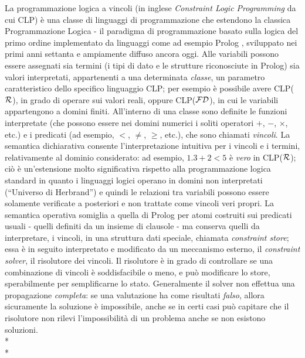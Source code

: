 \documentclass[12pt,a4paper,openright,twoside]{report}
\newcommand{\clpr}{CLP({\ensuremath{\cal R}})}
\newcommand{\clpfd}{CLP({\ensuremath{\cal FD}})}
\begin{document}
La programmazione logica a vincoli \cite{clpSurvey} (in inglese \emph{Constraint Logic Programming} da cui CLP) è una classe di linguaggi di programmazione che estendono la classica Programmazione Logica - il paradigma di programmazione basato sulla logica del primo ordine implementato da linguaggi come ad esempio Prolog \cite{Colmerauer,Kowalski,clocksin2003programming}, sviluppato nei primi anni settanta e ampiamente diffuso ancora oggi. Alle variabili possono essere assegnati sia termini (i tipi di dato e le strutture riconosciute in Prolog) sia valori interpretati, appartenenti a una determinata \emph{classe}, un parametro caratteristico dello specifico linguaggio CLP; per esempio è possibile avere \clpr \cite{clpR}, in grado di operare sui valori reali, oppure \clpfd, in cui le variabili appartengono a domini finiti. All'interno di una classe sono definite le funzioni interpretate (che possono essere nei domini numerici i soliti operatori $+$, $-$, $\times$, etc.) e i predicati (ad esempio, $<$, $\neq$, $\geq$, etc.), che sono chiamati \emph{vincoli}. La semantica dichiarativa consente l'interpretazione intuitiva per i vincoli e i termini, relativamente al dominio considerato: ad esempio, $1.3+2<5$ è \emph{vero} in \clpr; ciò è un'estensione molto significativa rispetto alla programmazione logica standard in quanto i linguaggi logici operano in domini non interpretati (``Universo di Herbrand'') e quindi le relazioni tra variabili possono essere solamente verificate a posteriori e non trattate come vincoli veri propri. La semantica operativa somiglia a quella di Prolog per atomi costruiti sui predicati usuali - quelli definiti da un insieme di clausole - ma conserva quelli da interpretare, i vincoli, in una struttura dati speciale, chiamata \emph{constraint store}; essa è in seguito interpretato e modificato da un meccanismo esterno, il \emph{constraint solver}, il risolutore dei vincoli. Il risolutore è in grado di controllare se una combinazione di vincoli è soddisfacibile o meno, e può modificare lo store, sperabilmente per semplificarne lo stato. Generalmente il solver non effettua una propagazione \emph{completa}: se una valutazione ha come risultati \emph{falso}, allora sicuramente la soluzione è impossibile, anche se in certi casi può capitare che il risolutore non rilevi l'impossibilità di un problema anche se non esistono soluzioni.\\*\\*  
\end{document}
